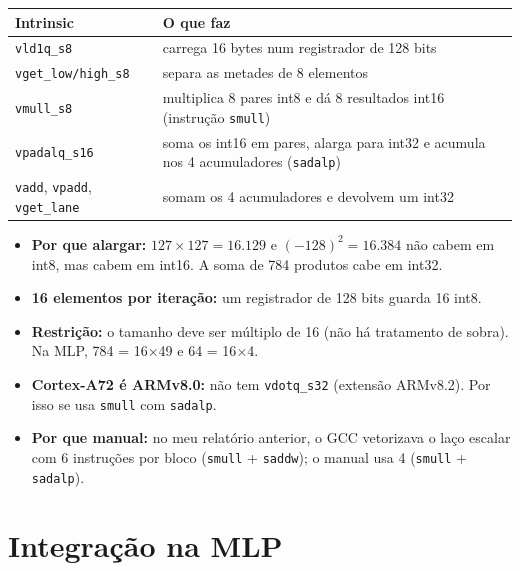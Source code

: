 \documentclass[10pt]{article}
\begin{document}
\begin{center}\footnotesize
\begin{tabularx}{\linewidth}{@{}l L@{}}
\toprule
Intrinsic & O que faz \\
\midrule
\texttt{vld1q\_s8} & carrega 16 bytes num registrador de 128 bits \\
\texttt{vget\_low/high\_s8} & separa as metades de 8 elementos \\
\texttt{vmull\_s8} & multiplica 8 pares int8 e dá 8 resultados int16 (instrução \texttt{smull}) \\
\texttt{vpadalq\_s16} & soma os int16 em pares, alarga para int32 e acumula nos 4 acumuladores (\texttt{sadalp}) \\
\texttt{vadd}, \texttt{vpadd}, \texttt{vget\_lane} & somam os 4 acumuladores e devolvem um int32 \\
\bottomrule
\end{tabularx}
\end{center}

\begin{itemize}
\item \textbf{Por que alargar:} $127\times127 = 16.129$ e $(-128)^2 = 16.384$ não cabem em int8,
      mas cabem em int16. A soma de 784 produtos cabe em int32.
\item \textbf{16 elementos por iteração:} um registrador de 128 bits guarda 16 int8.
\item \textbf{Restrição:} o tamanho deve ser múltiplo de 16 (não há tratamento de sobra). Na MLP,
      784 = 16$\times$49 e 64 = 16$\times$4.
\item \textbf{Cortex-A72 é ARMv8.0:} não tem \texttt{vdotq\_s32} (extensão ARMv8.2). Por isso se usa
      \texttt{smull} com \texttt{sadalp}.
\item \textbf{Por que manual:} no meu relatório anterior, o GCC vetorizava o laço escalar com 6
      instruções por bloco (\texttt{smull} + \texttt{saddw}); o manual usa 4 (\texttt{smull} + \texttt{sadalp}).
\end{itemize}

\section{Integração na MLP}
\end{document}
